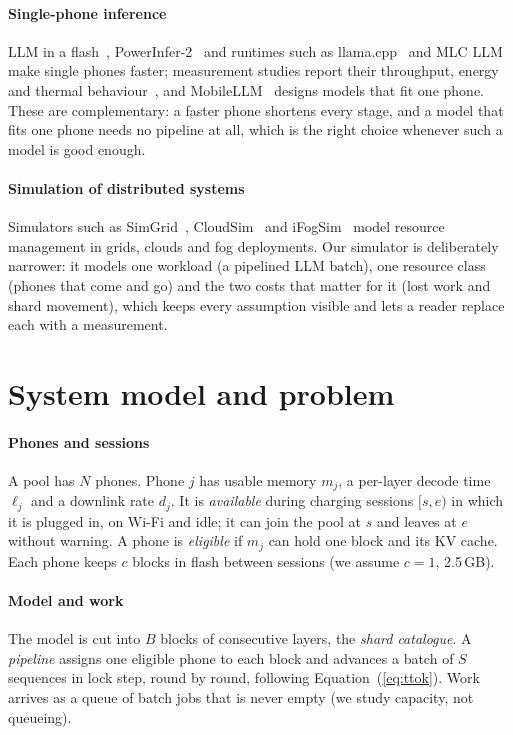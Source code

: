 \documentclass[preprint,review,12pt,authoryear]{elsarticle}
\begin{document}
\paragraph{Single-phone inference}
LLM in a flash~\citep{llminaflash}, PowerInfer-2~\citep{powerinfer2} and
runtimes such as llama.cpp~\citep{llamacpp} and MLC LLM~\citep{mlcllm} make
single phones faster; measurement studies report their throughput, energy and
thermal behaviour~\citep{melt,mobilellmmeasure}, and MobileLLM~\citep{mobilellm}
designs models that fit one phone. These are complementary: a faster phone
shortens every stage, and a model that fits one phone needs no pipeline at
all, which is the right choice whenever such a model is good enough.

\paragraph{Simulation of distributed systems}
Simulators such as SimGrid~\citep{simgrid}, CloudSim~\citep{cloudsim} and
iFogSim~\citep{ifogsim} model resource management in grids, clouds and fog
deployments. Our simulator is deliberately narrower: it models one workload
(a pipelined LLM batch), one resource class (phones that come and go) and the
two costs that matter for it (lost work and shard movement), which keeps every
assumption visible and lets a reader replace each with a measurement.

\section{System model and problem}
\label{sec:system}

\paragraph{Phones and sessions} A pool has $N$ phones. Phone $j$ has usable
memory $m_j$, a per-layer decode time $\ell_j$ and a downlink rate $d_j$. It is
\emph{available} during charging sessions $[s, e)$ in which it is plugged in, on
Wi-Fi and idle; it can join the pool at $s$ and leaves at $e$ without warning.
A phone is \emph{eligible} if $m_j$ can hold one block and its KV cache. Each
phone keeps $c$ blocks in flash between sessions (we assume $c=1$, 2.5\,GB).

\paragraph{Model and work} The model is cut into $B$ blocks of consecutive
layers, the \emph{shard catalogue}. A \emph{pipeline} assigns one eligible
phone to each block and advances a batch of $S$ sequences in lock step,
round by round, following Equation~(\ref{eq:ttok}). Work arrives as a queue of
batch jobs that is never empty (we study capacity, not queueing).
\end{document}
